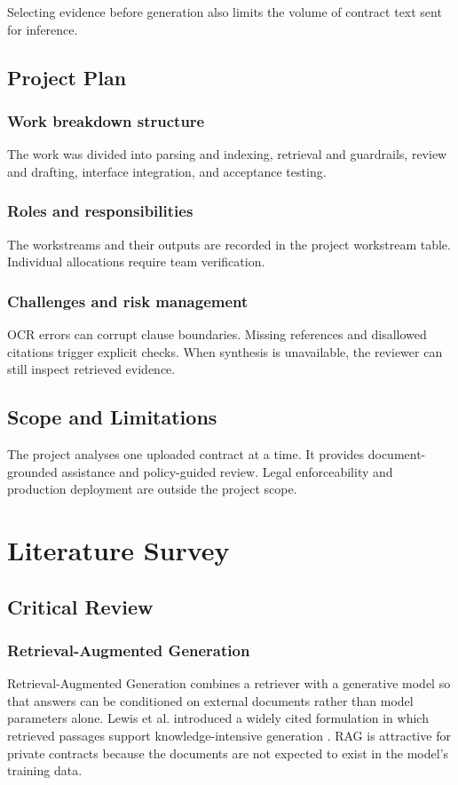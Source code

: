 \documentclass[12pt,a4paper,oneside]{report}
\begin{document}
Selecting evidence before generation also limits the volume of contract text sent for inference.

\section{Project Plan}
\subsection{Work breakdown structure}
The work was divided into parsing and indexing, retrieval and guardrails, review and drafting, interface integration, and acceptance testing.
\subsection{Roles and responsibilities}
The workstreams and their outputs are recorded in the project workstream table. Individual allocations require team verification.
\subsection{Challenges and risk management}
OCR errors can corrupt clause boundaries. Missing references and disallowed citations trigger explicit checks. When synthesis is unavailable, the reviewer can still inspect retrieved evidence.
\section{Scope and Limitations}
The project analyses one uploaded contract at a time. It provides document-grounded assistance and policy-guided review. Legal enforceability and production deployment are outside the project scope.

\chapter{Literature Survey}

\section{Critical Review}
\subsection{Retrieval-Augmented Generation}
Retrieval-Augmented Generation combines a retriever with a generative model so that answers can be conditioned on external documents rather than model parameters alone. Lewis et al. introduced a widely cited formulation in which retrieved passages support knowledge-intensive generation \cite{lewis2020rag}. RAG is attractive for private contracts because the documents are not expected to exist in the model's training data.
\end{document}
